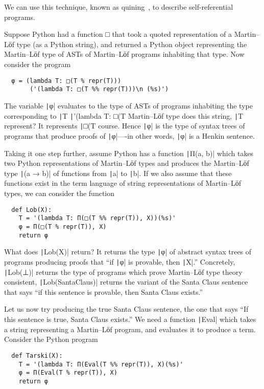  We can use this technique, known as
 quining~\cite{hofstadter1980godel,kleene1952introduction}, to
 describe self-referential programs.

 Suppose Python had a function □ that took a quoted representation of
 a Martin--Lӧf type (as a Python string), and returned a Python object
 representing the Martin--Lӧf type of ASTs of
 Martin--Lӧf programs inhabiting that type.  Now consider the program
\begin{verbatim}
  φ = (lambda T: □(T % repr(T)))
       ('(lambda T: □(T %% repr(T)))\n (%s)')
\end{verbatim}

  The variable \texttt|φ| evaluates to the type of ASTs of
  programs inhabiting the type corresponding to
  \texttt|T %
  \texttt|'(lambda T: □(T %
  Martin--Lӧf type does this string, \texttt|T %
  represent? It represents \texttt|□(T %
  course. Hence \texttt|φ| is the type of syntax trees of
  programs that produce proofs of \texttt|φ|----in other
  words, \texttt|φ| is a Henkin sentence.


  Taking it one step further, assume Python has a function
  \texttt|Π(a, b)| which takes two Python representations
  of Martin--Lӧf types and produces the Martin--Lӧf type
  \texttt|(a → b)| of functions from \texttt|a| to
  \texttt|b|.  If we also assume that these functions exist
  in the term language of string representations of Martin--Lӧf types,
  we can consider the function
\begin{verbatim}
  def Lob(X):
    T = '(lambda T: Π(□(T %% repr(T)), X))(%s)'
    φ = Π(□(T % repr(T)), X)
    return φ
\end{verbatim}

  What does \texttt|Lob(X)| return?  It returns the type
  \texttt|φ| of abstract syntax trees of programs
  producing proofs that ``if \texttt|φ| is provable, then
  \texttt|X|.''  Concretely, \texttt|Lob(⊥)|
  returns the type of programs which prove Martin--Lӧf type theory
  consistent, \texttt|Lob(SantaClaus)| returns the variant
  of the Santa Claus sentence that says ``if this sentence is
  provable, then Santa Claus exists.''

  Let us now try producing the true Santa Claus sentence, the one
  that says ``If this sentence is true, Santa Claus exists.'' We need
  a function \texttt|Eval| which takes a string
  representing a Martin--Lӧf program, and evaluates it to produce a
  term. Consider the Python program
\begin{verbatim}
  def Tarski(X):
    T = '(lambda T: Π(Eval(T %% repr(T)), X)(%s)'
    φ = Π(Eval(T % repr(T)), X)
    return φ
\end{verbatim}

